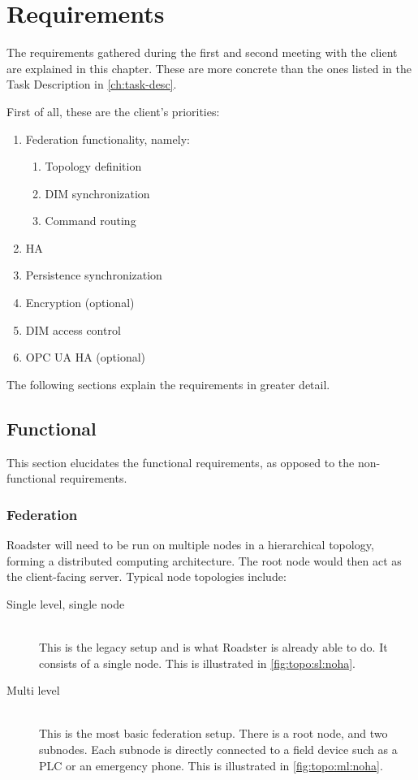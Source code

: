 \chapter{Requirements}
The requirements gathered during the first and second meeting with the client are
explained in this chapter. These are more concrete than the ones listed in the
Task Description in \autoref{ch:task-desc}.

First of all, these are the client's priorities:

\begin{enumerate}
\item Federation functionality, namely:
	\begin{enumerate}
		\item Topology definition
		\item DIM synchronization
		\item Command routing
	\end{enumerate}
\item \Gls{HA}
\item Persistence synchronization
\item Encryption (optional)
\item DIM access control
\item OPC UA \gls{HA} (optional)
\end{enumerate}

The following sections explain the requirements in greater detail.

\section{Functional}
This section elucidates the functional requirements, as opposed to the
non-functional requirements.

\subsection{Federation}
Roadster will need to be run on multiple nodes in a hierarchical topology,
forming a distributed computing architecture. The root node would then act as
the client-facing server. Typical node topologies include:

\begin{description}
	\item [ Single level, single node ] \hfill\\
		This is the legacy setup and is what Roadster is already able
		to do. It consists of a single node. This is illustrated in
		\autoref{fig:topo:sl:noha}.

	\item [ Multi level ] \hfill\\
		This is the most basic federation setup. There is a root node, and
		two subnodes. Each subnode is directly connected to a field device such as a
		PLC or an emergency phone. This is illustrated in
		\autoref{fig:topo:ml:noha}.
\end{description}


